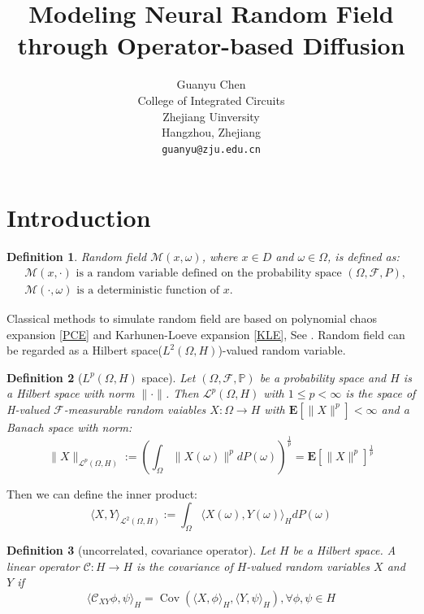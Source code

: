 \documentclass{article}
\title{Modeling Neural Random Field through Operator-based Diffusion}
\author{%
    Guanyu Chen \\
    College of Integrated Circuits\\
    Zhejiang Uinversity\\
    Hangzhou, Zhejiang\\
    \texttt{guanyu@zju.edu.cn} 
}
\newtheorem{definition}{Definition}
\begin{document}
\maketitle


\begin{abstract}

\end{abstract}


\section{Introduction}
\begin{definition}
    Random field $\mathcal{M}(x, \omega)$, where $x\in D$ and $\omega \in \Omega$, is defined as:
\begin{equation}
    \begin{aligned}
        & \mathcal{M}(x, \cdot) \text{ is a random variable defined on the probability space } (\Omega, \mathcal{F}, P),\\
        & \mathcal{M}(\cdot, \omega) \text{ is a deterministic function of } x.
    \end{aligned}
\end{equation}
\end{definition}
Classical methods to simulate random field are based on polynomial chaos expansion \ref{PCE} and Karhunen-Loeve expansion \ref{KLE}, See \cite{Lord_Powell_Shardlow_2014}.
Random field can be regarded as a Hilbert space($L^2(\Omega, H)$)-valued random variable.
\begin{definition}[$L^p(\Omega, H)$ space]
  Let $(\Omega, \mathcal{F}, \mathbb{P})$ be a probability space and $H$ is a Hilbert space with norm $\|\cdot\|$. Then $\mathcal{L}^p(\Omega, H)$ with $1\leq p<\infty$ is the space
  of H-valued $\mathcal{F}$-measurable random vaiables $X:\Omega\rightarrow H$ with $\mathbf{E}[\|X\|^p]<\infty$ and a Banach space with norm:
  \begin{equation}
      \|X\|_{\mathcal{L}^p(\Omega, H)}:=\left(\int_\Omega \|X(\omega)\|^pdP(\omega)\right)^{\frac{1}{p}}=\mathbf{E}[\|X\|^p]^{\frac{1}{p}}
  \end{equation}
\end{definition}
Then we can define the inner product: 
\begin{equation}
  \langle X, Y\rangle_{\mathcal{L}^2(\Omega, H)}:=\int_\Omega \langle X(\omega), Y(\omega)\rangle_H dP(\omega)
\end{equation}

\begin{definition}[uncorrelated, covariance operator]
  Let $H$ be a Hilbert space. A linear operator $\mathcal{C}:H\rightarrow H$ is the covariance of $H$-valued random variables $X$ and $Y$ if 
  \begin{equation}
      \langle\mathcal{C}_{XY}\phi, \psi\rangle_H = \operatorname{Cov}\left(\langle X, \phi\rangle_H, \langle Y, \psi\rangle_H\right), \forall \phi, \psi \in H
  \end{equation}
\end{definition}
\end{document}
